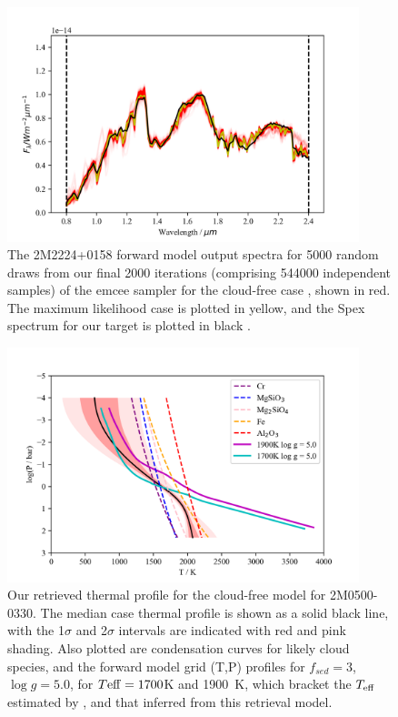 \documentclass[useAMS,usenatbib]{mn2e}
\begin{document}
\begin{figure}
\hspace{-0.8cm}\includegraphics[width=290pt]{2M2224_specSPAG_NoCloud_ucl.png}
\caption{ The 2M2224+0158 forward model output spectra for 5000 random draws from our final 2000 iterations (comprising 544000 independent samples) of the {\sc emcee} sampler for the cloud-free case , shown in red. The maximum likelihood case is plotted in yellow, and the Spex spectrum for our target is plotted in black \citep{burgasser2010a}. 
\label{fig:2m2224NCspec}}
\end{figure}

\begin{figure}
\hspace{-0.8cm}\includegraphics[width=290pt]{2M0500_profile_2sigma_GRID_NC_ucl.png}
\caption{Our retrieved thermal profile for the cloud-free model for 2M0500-0330. The median case thermal profile is shown as a solid black line, with the 1$\sigma$  and 2$\sigma$ intervals are indicated with red and pink shading.  Also plotted are condensation curves for likely cloud species, and the forward model grid (T,P) profiles for $f_{sed} = 3$, $\log g = 5.0$,  for $T{\rm eff} =  1700$K and 1900~K, which bracket the $T_{\rm eff}$ estimated by \citet{filippazzo2015}, and that inferred from this retrieval model.
\label{fig:2m0500NCprof}}
\end{figure}
\end{document}
